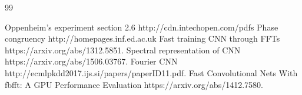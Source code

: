 \documentclass[letterpaper, 10 pt, conference]{ieeeconf}  %
\begin{document}









\begin{thebibliography}{99}

 Oppenheim's experiment section 2.6 http://cdn.intechopen.com/pdfs
 Phase congruency http://homepages.inf.ed.ac.uk
 Fast training CNN through FFTs https://arxiv.org/abs/1312.5851.
 Spectral representation of CNN https://arxiv.org/abs/1506.03767.
 Fourier CNN http://ecmlpkdd2017.ijs.si/papers/paperID11.pdf.
 Fast Convolutional Nets With fbfft: A GPU Performance Evaluation https://arxiv.org/abs/1412.7580.






\end{thebibliography}
\end{document}
